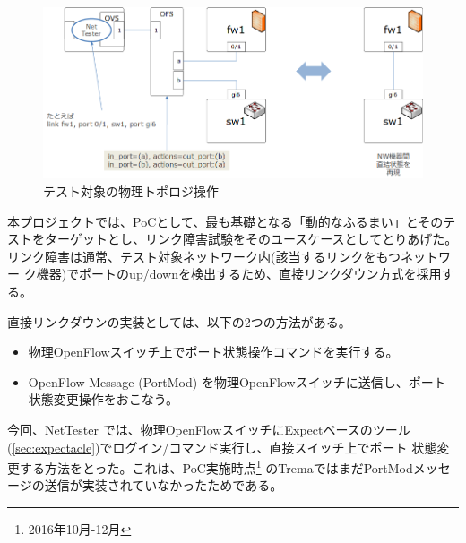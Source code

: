 \begin{figure}[h]
 \centering
 \includegraphics[scale=0.6]{img/patch-layer1.png}
 \caption{テスト対象の物理トポロジ操作}
 \label{fig:patch-layer1}
\end{figure}

本プロジェクトでは、PoCとして、最も基礎となる「動的なふるまい」とそのテ
ストをターゲットとし、リンク障害試験をそのユースケースとしてとりあげた。
リンク障害は通常、テスト対象ネットワーク内(該当するリンクをもつネットワー
ク機器)でポートのup/downを検出するため、直接リンクダウン方式を採用する。

直接リンクダウンの実装としては、以下の2つの方法がある。
\begin{itemize}
 \item 物理OpenFlowスイッチ上でポート状態操作コマンドを実行する。
 \item OpenFlow Message (PortMod) を物理OpenFlowスイッチに送信し、ポート
       状態変更操作をおこなう。
\end{itemize}
今回、NetTester では、物理OpenFlowスイッチにExpectベースのツール
(\ref{sec:expectacle})でログイン/コマンド実行し、直接スイッチ上でポート
状態変更する方法をとった。これは、PoC実施時点\footnote{2016年10月-12月}
のTremaではまだPortModメッセージの送信が実装されていなかったためである。




